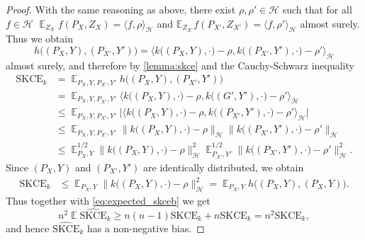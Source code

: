 \documentclass{article}
\DeclareMathOperator{\Exp}{\mathbb{E}}
\begin{document}
\begin{proof}
With the same reasoning as above, there exist $\rho, \rho' \in \mathcal{H}$ such
that for all $f \in \mathcal{H}$ $\Exp_{Z_X} f(P_X, Z_X) = \langle f, \rho \rangle_{\mathcal{H}}$
and $\mathbb{E}_{Z_{X'}} f(P_{X'}, Z_{X'}) = \langle f, \rho' \rangle_{\mathcal{H}}$
almost surely. Thus we obtain
\begin{equation*}
    h\big((P_X, Y), (P_{X'}, Y')\big)
    = \langle k\big((P_X, Y), \cdot\big) - \rho, k\big((P_{X'}, Y'), \cdot\big) - \rho' \rangle_{\mathcal{H}}
\end{equation*}
almost surely, and therefore by \cref{lemma:skce} and the
Cauchy-Schwarz inequality
\begin{equation*}
    \begin{split}
        \mathrm{SKCE}_k &= \Exp_{P_X,Y,P_{X'},Y'} h\big((P_X, Y), (P_{X'}, Y')\big) \\
        &= \Exp_{P_X,Y,P_{X'},Y'} \langle k\big((P_X, Y), \cdot\big) - \rho, k\big((G', Y'), \cdot\big) - \rho' \rangle_{\mathcal{H}} \\
        &\leq \Exp_{P_X,Y,P_{X'},Y'} \big|\langle k\big((P_X, Y), \cdot\big) - \rho, k\big((P_{X'}, Y'), \cdot\big) - \rho' \rangle_{\mathcal{H}}\big| \\
        &\leq \Exp_{P_X,Y,P_{X'},Y'} \big\|k\big((P_X, Y), \cdot\big) - \rho\big\|_{\mathcal{H}} \big\|k\big((P_{X'}, Y'), \cdot\big) - \rho' \big\|_{\mathcal{H}} \\
        &\leq \Exp_{P_X,Y}^{1/2} \big\|k\big((P_X, Y), \cdot\big) - \rho\big\|^2_{\mathcal{H}} \Exp_{P_{X'},Y'}^{1/2}\big\|k\big((P_{X'}, Y'), \cdot\big) - \rho' \big\|^2_{\mathcal{H}}.
\end{split}
\end{equation*}
Since $(P_X,Y)$ and $(P_{X'},Y')$ are identically distributed, we obtain
\begin{equation*}
    \begin{split}
        \mathrm{SKCE}_k &\leq \Exp_{P_X,Y} \big\|k\big((P_X, Y), \cdot\big) - \rho\big\|^2_{\mathcal{H}} = \Exp_{P_X,Y} h\big((P_X,Y),(P_X,Y)\big).
    \end{split}
\end{equation*}
Thus together with \cref{eq:expected_skceb} we get
\begin{equation*}
    n^2 \Exp \widehat{\mathrm{SKCE}}_k \geq n (n - 1) \mathrm{SKCE}_k + n \mathrm{SKCE}_k = n^2 \mathrm{SKCE}_k,
\end{equation*}
and hence $\widehat{\mathrm{SKCE}}_k$ has a non-negative bias.
\end{proof}
\end{document}
